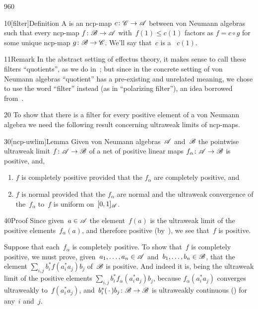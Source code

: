 \begin{parsec}{960}%
\begin{point}{10}[filter]{Definition}%
A %
is an ncp-map $c\colon \mathscr{C}\to\mathscr{A}$
between von Neumann algebras
such that every ncp-map $f\colon \mathscr{B}\to\mathscr{A}$
with~$f(1)\leq c(1)$
factors as $f=c\circ g$
for some unique ncp-map $g \colon \mathscr{B}\to\mathscr{C}$.
We'll say that~$c$ is a ~$c(1)$.
\begin{point}{11}{Remark}%
In the abstract setting of effectus theory,
it makes sense to call these filters
``quotients'', as we do in~\cite{cho2015quotient};
but since in the concrete setting of von Neumann algebras
``quotient'' has a pre-existing and unrelated meaning,
we chose to use the word ``filter'' instead (as in ``polarizing filter''),
an idea borrowed from~\cite{wilce2016royal}.
\end{point}
\end{point}
\begin{point}{20}%
To show that there is a filter
for every positive element of a von Neumann algebra
we need the following result
concerning ultraweak limits of ncp-maps.
\end{point}
\begin{point}{30}[ncp-uwlim]{Lemma}%
Given von Neumann algebras~$\mathscr{A}$
and~$\mathscr{B}$
the pointwise ultraweak limit
$f\colon \mathscr{A}\to\mathscr{B}$
of a net of  positive linear maps $f_\alpha\colon \mathscr{A}\to\mathscr{B}$
is positive, and, 
\begin{enumerate}
\item
$f$ is completely positive provided
that the $f_\alpha$ are completely positive, and
\item
$f$ is normal provided that the $f_\alpha$ are normal
and the ultraweak convergence of the~$f_\alpha$ to~$f$
is uniform on~$[0,1]_{\mathscr{A}}$.
\end{enumerate}
\spacingfix%
\begin{point}{40}{Proof}%
Since given~$a\in \mathscr{A}$ the element~$f(a)$
is the ultraweak limit of the positive elements~$f_\alpha(a)$,
and therefore positive (by~),
we see that~$f$ is positive.

Suppose that each~$f_\alpha$ is completely positive.
To show that~$f$ is completely positive,
we must prove, given~$a_1,\dotsc,a_n\in\mathscr{A}$
and~$b_1,\dotsc,b_n\in\mathscr{B}$,
that 
the element $\sum_{i,j} b_i^* f(a_i^*a_j)b_j$
of~$\mathscr{B}$
is positive.
And indeed it is,
being the ultraweak limit of
the positive elements $\sum_{i,j} b_i^* f_\alpha (a_i^* a_j)b_j$,
because  $f_\alpha(a_i^* a_j)$
converges ultraweakly to~$f(a_i^* a_j)$,
and~$b_i^*(\,\cdot\,)b_j\colon \mathscr{B}\to\mathscr{B}$
is ultraweakly continuous
()
for any~$i$ and~$j$.


\end{point}
\end{point}
\end{parsec}
